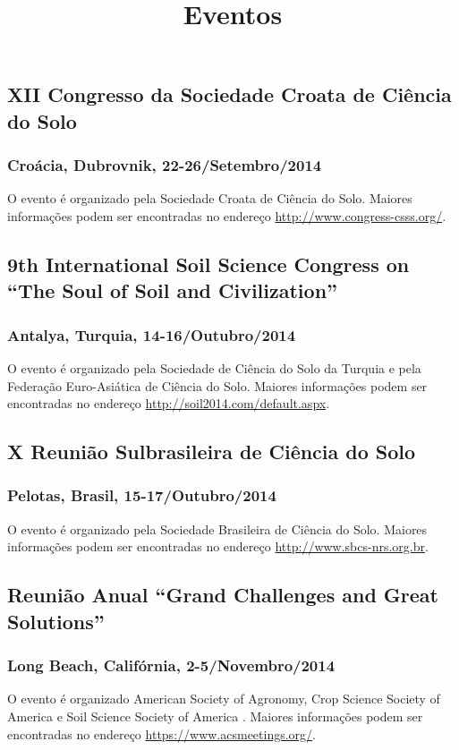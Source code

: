 \title{Eventos}
\maketitle

\subsection{XII Congresso da Sociedade Croata de Ciência do Solo}
\subsubsection{Croácia, Dubrovnik, 22-26/Setembro/2014}
O evento é organizado pela Sociedade Croata de Ciência do Solo.
Maiores informações podem ser encontradas no endereço \url{http://www.congress-csss.org/}.

\subsection{9th International Soil Science Congress on ``The Soul of Soil and Civilization''}
\subsubsection{Antalya, Turquia, 14-16/Outubro/2014}
O evento é organizado pela Sociedade de Ciência do Solo da Turquia e pela Federação Euro-Asiática de Ciência do Solo.
Maiores informações podem ser encontradas no endereço \url{http://soil2014.com/default.aspx}.

\subsection{X Reunião Sulbrasileira de Ciência do Solo}
\subsubsection{Pelotas, Brasil, 15-17/Outubro/2014}
O evento é organizado pela Sociedade Brasileira de Ciência do Solo.
Maiores informações podem ser encontradas no endereço \url{http://www.sbcs-nrs.org.br}.

\subsection{Reunião Anual ``Grand Challenges and Great Solutions''}
\subsubsection{Long Beach, Califórnia, 2-5/Novembro/2014}
O evento é organizado American Society of Agronomy, Crop Science Society of America e Soil Science Society of America .
Maiores informações podem ser encontradas no endereço \url{https://www.acsmeetings.org/}.

